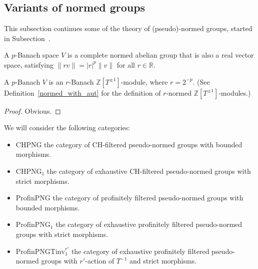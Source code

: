 \subsection{Variants of normed groups}
\label{sec:normed_groups2}

This subsection continues some of the theory of (pseudo)-normed groups,
started in Subsection~\label{sec:normed_groups}.

\begin{definition}
  \label{p-banach}
  A $p$-Banach space $V$ is a complete normed abelian group
  that is also a real vector space,
  satisfying $\|rv\| = |r|^p\|v\|$ for all $r \in \mathbb R$.
\end{definition}

\begin{lemma}
  \label{p-banach-r-normed}
   A $p$-Banach $V$ is an $r$-Banach $\mathbb Z[T^{\pm 1}]$-module, where $r=2^{-p}$.
   (See Definition~\ref{normed_with_aut} for the definition of $r$-normed $\mathbb Z[T^{\pm 1}]$-modules.)
\end{lemma}

\begin{proof}
  Obvious.
\end{proof}

\begin{definition}
  \label{png-cats}
  \leanok
  We will consider the following categories:
  \begin{itemize}
    \item $\text{CHPNG}$ the category of CH-filtered pseudo-normed groups with bounded morphisms.
    \item $\text{CHPNG}_1$ the category of exhaustive CH-filtered pseudo-normed groups with strict morphisms.
    \item $\text{ProfinPNG}$ the category of profinitely filtered pseudo-normed groups with bounded morphisms.
    \item $\text{ProfinPNG}_1$ the category of exhaustive profinitely filtered pseudo-normed groups with strict morphisms.
    \item $\text{ProfinPNGTinv}_1^{r'}$ the category of exhaustive profinitely filtered pseudo-normed groups with $r'$-action of $T^{-1}$ and strict morphisms.
  \end{itemize}
\end{definition}

